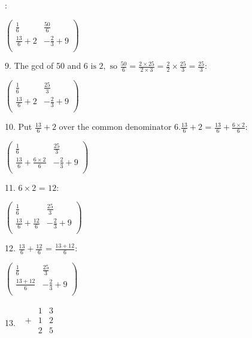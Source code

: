 \documentclass{article}
\begin{document}
:

$\left(
\begin{array}{cc}
\frac{1}{6} & \frac{50}{6} \\
 \frac{13}{6}+2 & -\frac{2}{3}+9 \\
\end{array}
\right)$

9. The gcd of 50 and $6\text{ is }2,\text{ so }\frac{50}{6}=\frac{2\times 25}{2\times 3}=\frac{2}{2}\times \frac{25}{3}=\frac{25}{3}$:

$\left(
\begin{array}{cc}
\frac{1}{6} & \frac{25}{3} \\
 \frac{13}{6}+2 & -\frac{2}{3}+9 \\
\end{array}
\right)$

10. Put $\frac{13}{6}+2\text{ over the common denominator }6. \frac{13}{6}+2\text{ = }\frac{13}{6}+\frac{6\times 2}{6}$:

$\left(
\begin{array}{cc}
\frac{1}{6} & \frac{25}{3} \\
 \frac{13}{6}+\frac{6\times 2}{6} & -\frac{2}{3}+9 \\
\end{array}
\right)$

11. $6\times 2\text{ = }12:$

$\left(
\begin{array}{cc}
\frac{1}{6} & \frac{25}{3} \\
 \frac{13}{6}+\frac{12}{6} & -\frac{2}{3}+9 \\
\end{array}
\right)$

12. $\frac{13}{6}+\frac{12}{6}\text{ = }\frac{13+12}{6}$:

$\left(
\begin{array}{cc}
\frac{1}{6} & \frac{25}{3} \\
 \frac{13+12}{6} & -\frac{2}{3}+9 \\
\end{array}
\right)$

13. $\begin{array}{c}
\begin{array}{ccc}
\hline
\text{  }& 1 & 3 \\
\hline
 + & 1 & 2 \\
\text{  }& 2 & 5 \\
\end{array}
 \\
\end{array}$
\end{document}

